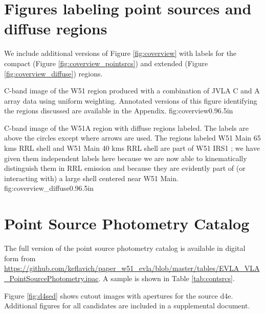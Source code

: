 

\appendix
\section{Figures labeling point sources and diffuse regions}
\label{sec:appendix_labels}
We include additional versions of Figure \ref{fig:coverview} with labels for
the compact (Figure \ref{fig:coverview_pointsrcs}) and extended (Figure
\ref{fig:coverview_diffuse}) \hii regions.

{C-band image of the W51 region produced with a combination of JVLA
C and A array data using uniform weighting.  Annotated versions of this figure
identifying the regions discussed are available in the Appendix.}
{fig:coverview}{0.9}{6.5in}


{C-band image of the W51A region with diffuse \hii regions labeled.  The labels
are above the circles except where arrows are used.  The regions labeled
{W51 Main 65 kms RRL shell} and {W51 Main 40 kms RRL shell} are part of  W51
IRS1 \citep[e.g.,][]{Zhang1997a}; we have given them independent labels here
because we are now able to kinematically
distinguish them in RRL emission and because they are evidently part of (or
interacting with) a large shell centered near W51 Main.}
{fig:coverview_diffuse}{0.9}{6.5in}

\onecolumn

\twocolumn

\clearpage
\section{Point Source Photometry Catalog}
\label{sec:SEDs}
The full version of the point source photometry catalog is available in digital
form from
\url{https://github.com/keflavich/paper_w51_evla/blob/master/tables/EVLA_VLA_PointSourcePhotometry.ipac}.
A sample is shown in Table \ref{tab:contsrcs}.


Figure \ref{fig:d4sed} shows cutout images with apertures for the source d4e.
Additional figures for all candidates are included in a supplemental document.

